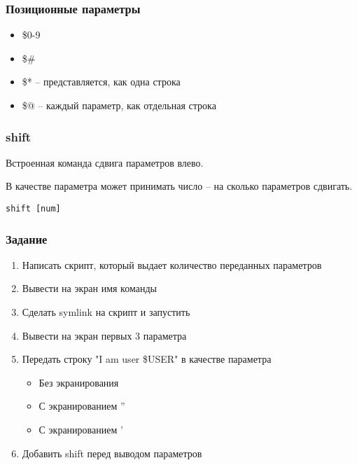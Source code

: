 
\begin{frame}
	\frametitle{Позиционные параметры}

	\begin{itemize}
		\item \$0-9
		\item \$\#
		\item \$* -- представляется,  как одна строка
		\item \$@ -- каждый параметр,  как отдельная строка
	\end{itemize}

\end{frame}


\begin{frame}[fragile]
	\frametitle{shift}

	Встроенная команда сдвига параметров влево.

	В качестве параметра может принимать число -- на сколько параметров сдвигать.

	\begin{lstlisting}
shift [num]
	\end{lstlisting}

\end{frame}


\begin{frame}
	\frametitle{Задание}

	\begin{enumerate}
		\item Написать скрипт,  который выдает количество переданных параметров
			\pause
		\item Вывести на экран имя команды
			\pause
		\item Сделать symlink на скрипт и запустить
			\pause
		\item Вывести на экран первых 3 параметра
			\pause
		\item Передать строку "I am user \$USER" в качестве параметра
			\begin{itemize}
				\item Без экранирования
				\item С экранированием ''
				\item С экранированием '
			\end{itemize}
			\pause
		\item Добавить shift перед выводом параметров
	\end{enumerate}
\end{frame}


